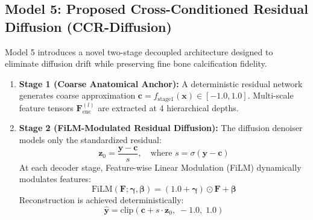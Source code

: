\subsection{Model 5: Proposed Cross-Conditioned Residual Diffusion (CCR-Diffusion)}
Model 5 introduces a novel two-stage decoupled architecture designed to eliminate diffusion drift while preserving fine bone calcification fidelity.
\begin{enumerate}
    \item \textbf{Stage 1 (Coarse Anatomical Anchor):} A deterministic residual network generates coarse approximation $\mathbf{c} = f_{\text{stage1}}(\mathbf{x}) \in [-1.0, 1.0]$. Multi-scale feature tensors $\mathbf{F}_{\text{enc}}^{(l)}$ are extracted at 4 hierarchical depths.
    \item \textbf{Stage 2 (FiLM-Modulated Residual Diffusion):} The diffusion denoiser models only the standardized residual:
    \begin{equation}
    \mathbf{z}_0 = \frac{\mathbf{y} - \mathbf{c}}{s}, \quad \text{where } s = \sigma(\mathbf{y} - \mathbf{c})
    \label{eq:res_std}
    \end{equation}
    At each decoder stage, Feature-wise Linear Modulation (FiLM) dynamically modulates features:
    \begin{equation}
    \text{FiLM}(\mathbf{F}; \boldsymbol{\gamma}, \boldsymbol{\beta}) = (1.0 + \boldsymbol{\gamma}) \odot \mathbf{F} + \boldsymbol{\beta}
    \label{eq:film_layer}
    \end{equation}
    Reconstruction is achieved deterministically:
    \begin{equation}
    \mathbf{\hat{y}} = \text{clip}(\mathbf{c} + s \cdot \mathbf{z}_0, \; -1.0, \; 1.0)
    \label{eq:ccr_final_recon}
    \end{equation}
\end{enumerate}


